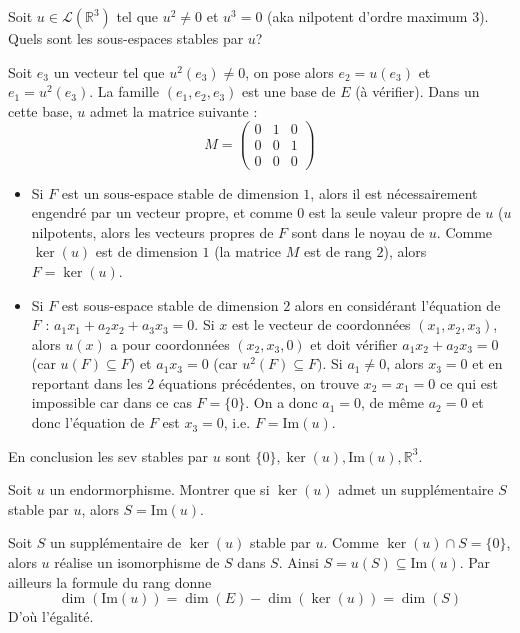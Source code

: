 \documentclass[answers,11pt]{exam}
\newcommand{\RR}{\mathbb{R}}
\begin{document}
\begin{questions}


\question Soit $u \in \mathcal{L}(\RR^3)$ tel que $u^2 \neq 0$ et $u^3=0$ (aka nilpotent d'ordre maximum $3$). Quels sont les sous-espaces stables par $u$?

\begin{solution}
	Soit $e_3$ un vecteur tel que $u^2(e_3) \neq 0$, on pose alors $e_2=u(e_3)$ et $e_1=u^2(e_3)$. La famille $(e_1,e_2,e_3)$ est une base de $E$ (à vérifier). Dans un cette base, $u$ admet la matrice suivante : \[ M=\begin{pmatrix}
		0 & 1 & 0 \\
		0 & 0 & 1 \\
		0 & 0 & 0
	\end{pmatrix} \]
	\begin{itemize}
		\item Si $F$ est un sous-espace stable de dimension $1$, alors il est nécessairement engendré par un vecteur propre, et comme $0$ est la seule valeur propre de $u$ ($u$ nilpotents, alors les vecteurs propres de $F$ sont dans le noyau de $u$. Comme $\ker(u)$ est de dimension $1$ (la matrice $M$ est de rang $2$), alors $F=\ker(u)$.
		\item Si $F$ est sous-espace stable de dimension $2$ alors en considérant l'équation de $F$ : $a_1 x_1 +a_2 x_2 + a_3 x_3=0$. Si $x$ est le vecteur de coordonnées $(x_1,x_2,x_3)$, alors $u(x)$ a pour coordonnées $(x_2,x_3,0)$ et doit vérifier $a_1 x_2 + a_2 x_3=0$ (car $u(F) \subseteq F$) et $a_1 x_3 = 0$ (car $u^2(F) \subseteq F)$. Si $a_1 \neq 0$, alors $x_3=0$ et en reportant dans les $2$ équations précédentes, on trouve $x_2=x_1=0$ ce qui est impossible car dans ce cas $F=\{0\}$. On a donc $a_1=0$, de même $a_2=0$ et donc l'équation de $F$ est $x_3=0$, i.e. $F=\mathrm{Im}(u)$.
	\end{itemize}
	En conclusion les sev stables par $u$ sont $\{0\}
	, \ker(u), \mathrm{Im}(u), \RR^3$.
\end{solution}

\question Soit $u$ un endormorphisme. Montrer que si $\ker(u)$ admet un supplémentaire $S$ stable par $u$, alors $S=\mathrm{Im}(u)$.

\begin{solution}
	Soit $S$ un supplémentaire de $\ker(u)$ stable par $u$. Comme $\ker(u) \cap S = \{0\}$, alors $u$ réalise un isomorphisme de $S$ dans $S$. Ainsi $S=u(S) \subseteq \mathrm{Im}(u)$. Par ailleurs la formule du rang donne \[ \dim(\mathrm{Im}(u))=\dim(E)-\dim(\ker(u))=\dim(S) \]
	D'où l'égalité.
\end{solution}


\end{questions}
\end{document}
